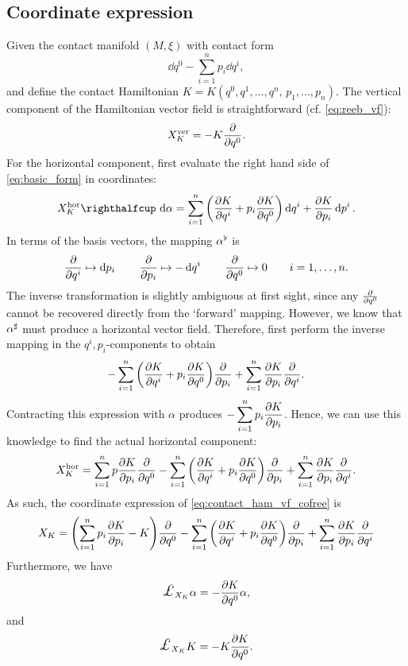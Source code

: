 \subsection*{Coordinate expression} Given the contact manifold \((M, \xi)\) with contact form
\begin{equation}
     \dd{q^0} - \sum_{i = 1}^n p_i\dd{q^i},
\end{equation}
and define the contact Hamiltonian \(K = K(q^0, q^1, \ldots, q^n,\, p_1, \ldots, p_n)\). 
The vertical component of the Hamiltonian vector field is straightforward (cf. \cref{eq:reeb_vf}): 
\begin{equation}
     X_K^\text{ver} = -K\pdv{}{q^0}.
\end{equation}
For the horizontal component, first evaluate the right hand side of \cref{eq:basic_form} in coordinates:
\begin{equation}
     \intpr{X_K^\text{hor}}{\dd{\alpha}} =  \sum_{i = 1}^n \qty(\pdv{K}{q^i} + p_i \pdv{K}{q^0})\dd{q^i} + \pdv{K}{p_i}\dd{p^i}.
\end{equation}
In terms of the basis vectors, the mapping \(\alpha^\flat\) is
\begin{equation}
     \pdv{}{q^i} \mapsto \dd{p_i} \qquad \pdv{}{p_i} \mapsto -\dd{q^i} \qquad \pdv{}{q^0} \mapsto 0 \qquad i = 1, \ldots, n.
\end{equation}
The inverse transformation is slightly ambiguous at first sight, since any \(\pdv{}{q^0}\) cannot be recovered directly from the `forward' mapping. However, we know that \(\alpha^\sharp\) must produce a horizontal vector field. Therefore, first perform the inverse mapping in the \(q^i, p_i\)-components to obtain
\begin{equation}
     - \sum_{i = 1}^n \qty(\pdv{K}{q^i} + p_i \pdv{K}{q^0})\pdv{}{p_i} + \sum_{i=1}^n \pdv{K}{p_i}\pdv{}{q^i}.
\end{equation}
Contracting this expression with \(\alpha\) produces \(\displaystyle - \sum_{i=1}^n p_i\pdv{K}{p_i} \). Hence, we can use this knowledge to find the actual horizontal component:
\begin{equation}
     X_K^\text{hor} = \sum_{i=1}^n p\pdv{K}{p_i} \pdv{}{q^0}- \sum_{i = 1}^n \qty(\pdv{K}{q^i} + p_i \pdv{K}{q^0})\pdv{}{p_i} + \sum_{i=1}^n \pdv{K}{p_i}\pdv{}{q^i}.
\end{equation}
As such, the coordinate expression of \cref{eq:contact_ham_vf_cofree} is 
\begin{equation}
    X_K = \qty(\sum_{i=1}^n p_i\pdv{K}{p_i} - K) \pdv{}{q^0}- \sum_{i = 1}^n \qty(\pdv{K}{q^i} + p_i \pdv{K}{q^0})\pdv{}{p_i} + \sum_{i=1}^n \pdv{K}{p_i}\pdv{}{q^i}
\end{equation}
Furthermore, we have
\begin{equation}
     \lied{X_K} \alpha = - \pdv{K}{q^0} \alpha,
\end{equation} 
and 
\begin{equation}
     \lied{X_K} K = - K\pdv{K}{q^0}.
\end{equation} 

